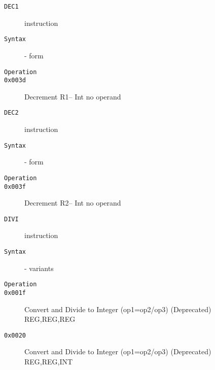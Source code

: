 \clearpage
\begin{description}
\item[\texttt{DEC1}] instruction\\
\item[\texttt{Syntax}] - form \\

\item[\texttt{Operation}]
\item[\texttt{}]
\item[\texttt{0x003d}] Decrement R1-- Int  no operand          \\
\end{description}
\clearpage
\begin{description}
\item[\texttt{DEC2}] instruction\\
\item[\texttt{Syntax}] - form \\

\item[\texttt{Operation}]
\item[\texttt{}]
\item[\texttt{0x003f}] Decrement R2-- Int  no operand          \\
\end{description}
\clearpage
\begin{description}
\item[\texttt{DIVI}] instruction\\
\item[\texttt{Syntax}] - variants\\

\item[\texttt{Operation}]
\item[\texttt{}]
\item[\texttt{0x001f}] Convert and Divide to Integer (op1=op2/op3) (Deprecated)  {REG,REG,REG}       \\
\item[\texttt{0x0020}] Convert and Divide to Integer (op1=op2/op3) (Deprecated)  {REG,REG,INT}       \\
\end{description}

